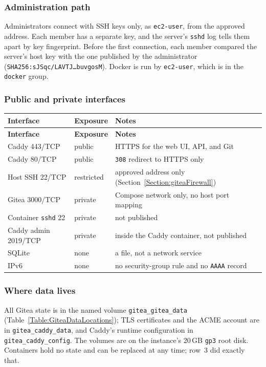 \subsubsection{Administration path}
Administrators connect with SSH keys only, as \texttt{ec2-user}, from the
approved address. Each member has a separate key, and the server's
\texttt{sshd} log tells them apart by key fingerprint. Before the first
connection, each member compared the server's host key with the one published
by the administrator (\texttt{SHA256:sJSqc/LAVTJ\ldots buvgosM}). Docker is
run by \texttt{ec2-user}, which is in the \texttt{docker} group.

\subsubsection{Public and private interfaces}
\begin{tabularx}{\linewidth}{L{3.4cm}L{2.2cm}Y}
\caption{Interfaces and exposure\label{Table:GiteaInterfaces}}\\
\toprule \textbf{Interface} & \textbf{Exposure} & \textbf{Notes}\\ \midrule
\endfirsthead
\toprule \textbf{Interface} & \textbf{Exposure} & \textbf{Notes}\\ \midrule
\endhead \bottomrule \endlastfoot
Caddy 443/TCP & public & HTTPS for the web UI, API, and Git\\
Caddy 80/TCP & public & \texttt{308} redirect to HTTPS only\\
Host SSH 22/TCP & restricted & approved address only (Section~\ref{Section:giteaFirewall})\\
Gitea 3000/TCP & private & Compose network only, no host port mapping\\
Container \texttt{sshd} 22 & private & not published\\
Caddy admin 2019/TCP & private & inside the Caddy container, not published\\
SQLite & none & a file, not a network service\\
IPv6 & none & no security-group rule and no \texttt{AAAA} record\\
\end{tabularx}

\subsubsection{Where data lives}
All Gitea state is in the named volume \texttt{gitea\_gitea\_data}
(Table~\ref{Table:GiteaDataLocations}); TLS certificates and the ACME account
are in \texttt{gitea\_caddy\_data}, and Caddy's runtime configuration in
\texttt{gitea\_caddy\_config}. The volumes are on the instance's 20\,GB
\texttt{gp3} root disk. Containers hold no state and can be replaced at any
time; row~3 did exactly that.


